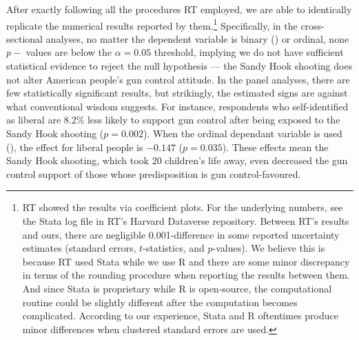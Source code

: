 \documentclass[11pt]{article}
\begin{document}
After exactly following all the procedures RT employed, we are able to identically replicate the numerical results reported by them.\footnote{RT showed the results via coefficient plots. For the underlying numbers, see the Stata log file in RT’s Harvard Dataverse repository. Between RT’s results and ours, there are negligible 0.001-difference in some reported uncertainty estimates (standard errors, \(t\)-statistics, and \(p\)-values). We believe this is because RT used Stata while we use R and there are some minor discrepancy in terms of the rounding procedure when reporting the results between them. And since Stata is proprietary while R is open-source, the computational routine could be slightly different after the computation becomes complicated. According to our experience, Stata and R oftentimes produce minor differences when clustered standard errors are used.} Specifically, in the cross-sectional analyses, no matter the dependent variable is binary () or ordinal, none \(p-\) values are below the \(\alpha = 0.05\) threshold, implying we do not have sufficient statistical evidence to reject the null hypothesis –– the Sandy Hook shooting does not alter American people’s gun control attitude. In the panel analyses, there are few statistically significant results, but strikingly, the estimated signs are against what conventional wisdom suggests. For instance, respondents who self-identified as liberal are 8.2\% less likely to support gun control after being exposed to the Sandy Hook shooting (\(p = 0.002\)). When the ordinal dependant variable is used (), the effect for liberal people is \(-0.147\) (\(p = 0.035\)). These effects mean the Sandy Hook shooting, which took 20 children’s life away, even decreased the gun control support of those whose predisposition is gun control-favoured.
\end{document}

